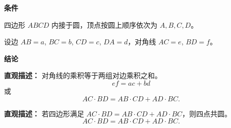 \begin{statementbox}
	\textbf{\textcolor{CStatement}{条件}}
	\begin{description}[style=nextline, leftmargin=2.8em, labelsep=0.5em, itemsep=0.35em]
		\item[\textbf{\textcolor{CStatement}{条件1（圆内接四边形）：}}] 四边形 $ABCD$ 内接于圆，顶点按圆上顺序依次为 $A,B,C,D$。
		\item[\textbf{\textcolor{CStatement}{条件2（边长与对角线）：}}] 设边 $AB=a$, $BC=b$, $CD=c$, $DA=d$，对角线 $AC=e$, $BD=f$。
	\end{description}

	\textbf{\textcolor{CStatement}{结论}}
	\begin{description}[style=nextline, leftmargin=2.8em, labelsep=0.5em, itemsep=0.45em]
		\item[\textbf{\textcolor{CStatement}{结论一（托勒密公式）：}}]
			\textbf{\textcolor{CStatement}{直观描述：}}
			对角线的乘积等于两组对边乘积之和。
			\[
				ef = ac + bd
			\]
			或
			\[
				AC\cdot BD = AB\cdot CD + AD\cdot BC .
			\]

		\item[\textbf{\textcolor{CStatement}{常见变形（逆定理）：}}]
			\textbf{\textcolor{CStatement}{直观描述：}}
			若四边形满足 $AC\cdot BD = AB\cdot CD + AD\cdot BC$，则四点共圆。
			\[
				AC\cdot BD = AB\cdot CD + AD\cdot BC .
			\]
	\end{description}
\end{statementbox}
